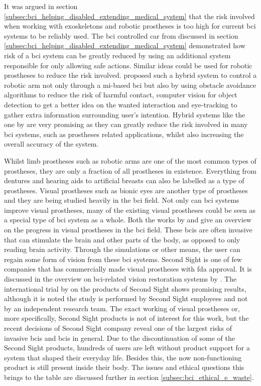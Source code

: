 It was argued in section \ref{subsec:bci_helping_disabled_extending_medical_system} that the risk involved when working with exoskeletons and robotic prostheses is too high for current \gls{bci} systems to be reliably used.
The \gls{bci} controlled car from \citet{bci_mi_four_wheel_drive} discussed in section \ref{subsec:bci_helping_disabled_extending_medical_system} demonstrated how risk of a \gls{bci} system can be greatly reduced by using an additional system responsible for only allowing safe actions.
Similar ideas could be used for robotic prostheses to reduce the risk involved.
 proposed such a hybrid system to control a robotic arm not only through a \gls{mi}-based \gls{bci} but also by using obstacle avoidance algorithms to reduce the risk of harmful contact, computer vision for object detection to get a better idea on the wanted interaction and eye-tracking to gather extra information surrounding user's intention.
Hybrid systems like the one by \citet{bci_mi_robotic_arm_collision_avoidance} are very promising as they can greatly reduce the risk involved in many \gls{bci} systems, such as prostheses related applications, whilst also increasing the overall accuracy of the system.

Whilst limb prostheses such as robotic arms are one of the most common types of prostheses, they are only a fraction of all prostheses in existence.
Everything from dentures and hearing aids to artificial breasts can also be labelled as a type of prostheses.
Visual prostheses such as bionic eyes are another type of prostheses and they are being studied heavily in the \gls{bci} field.
Not only can \gls{bci} systems improve visual prostheses, many of the existing visual prostheses could be seen as a special type of \gls{bci} system as a whole.
Both the works by \citet{bci_blind_assist_review} and \citet{bci_vision_assist_review} give an overview on the progress in visual prostheses in the \gls{bci} field.
These \glspl{bci} are often invasive that can stimulate the brain and other parts of the body, as opposed to only reading brain activity.
Through the simulations or other means, the user can regain some form of vision from these \gls{bci} systems.
Second Sight is one of few companies that has commercially made visual prostheses with \gls{fda} approval.
It is discussed in the overview on \gls{bci}-related vision restoration systems by \citet{bci_vision_assist_review}.
The international trial by \citet{second_sight_trial} on the products of Second Sight shows promising results, although it is noted the study is performed by Second Sight employees and not by an independent research team.
The exact working of visual prostheses or, more specifically, Second Sight products is not of interest for this work, but the recent decisions of Second Sight company reveal one of the largest risks of invasive \glspl{bci} and \glspl{bci} in general.
Due to the discontinuation of some of the Second Sight products, hundreds of users are left without product support for a system that shaped their everyday life.
Besides this, the now non-functioning product is still present inside their body.
The issues and ethical questions this brings to the table are discussed further in section \ref{subsec:bci_ethical_e_waste}.

